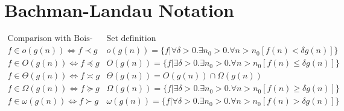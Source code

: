 \documentclass{report}
\begin{document}
    \section*{Bachman-Landau Notation}
        \[\begin{matrix}
            \text{Comparison with Bois-Reymond} & \text{Set definition} \\
            f \in o(g(n)) \Leftrightarrow f \prec g & o(g(n)) = \{f | \forall \delta > 0. \exists n_0 > 0.\forall n > n_0 [f(n) < \delta g(n)]\} \\
            f \in O(g(n)) \Leftrightarrow f \preccurlyeq g & O(g(n)) = \{f | \exists \delta > 0. \exists n_0 > 0.\forall n > n_0 [f(n) \leq \delta g(n)]\} \\
            f \in \Theta (g(n)) \Leftrightarrow f \asymp g & \Theta (g(n)) = O(g(n)) \cap \Omega(g(n)) \\
            f \in \Omega (g(n)) \Leftrightarrow f \succcurlyeq g & \Omega (g(n)) = \{f | \exists \delta > 0. \exists n_0 > 0.\forall n > n_0 [f(n) \geq \delta g(n)]\} \\
            f \in \omega (g(n)) \Leftrightarrow f \succ g & \omega (g(n)) = \{f | \forall \delta > 0. \exists n_0 > 0.\forall n > n_0 [f(n) > \delta g(n)]\} \\
        \end{matrix}\]
\end{document}

